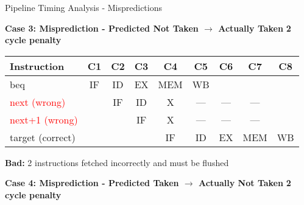 \documentclass[aspectratio=169,12pt]{beamer}
\newcommand{\xmark}{\ding{55}} %
\begin{document}
\begin{frame}{Pipeline Timing Analysis - Mispredictions}
\scriptsize
\vspace{0.3cm}

\begin{center}
\colorbox{red!10}{
\begin{minipage}{0.95\textwidth}
\textbf{Case 3: Misprediction - Predicted Not Taken $\rightarrow$ Actually Taken} \hfill \textcolor{red!70!black}{\textbf{2 cycle penalty} \xmark}
\vspace{0.1cm}

\begin{tabular}{l|c|c|c|c|c|c|c|c}
\textbf{Instruction} & \textbf{C1} & \textbf{C2} & \textbf{C3} & \textbf{C4} & \textbf{C5} & \textbf{C6} & \textbf{C7} & \textbf{C8} \\
\hline
beq & \cellcolor{normalexec!40}IF & \cellcolor{normalexec!40}ID & \cellcolor{normalexec!40}EX & \cellcolor{normalexec!40}MEM & \cellcolor{normalexec!40}WB & & & \\
\textcolor{red}{next (wrong)} & & \cellcolor{normalexec!40}IF & \cellcolor{flushcolor!40}ID & \cellcolor{flushcolor!40}\textsf{X} & \cellcolor{emptycolor}--- & \cellcolor{emptycolor}--- & \cellcolor{emptycolor}--- & \\
\textcolor{red}{next+1 (wrong)} & & & \cellcolor{flushcolor!40}IF & \cellcolor{flushcolor!40}\textsf{X} & \cellcolor{emptycolor}--- & \cellcolor{emptycolor}--- & \cellcolor{emptycolor}--- & \\
target (correct) & & & & \cellcolor{normalexec!40}IF & \cellcolor{normalexec!40}ID & \cellcolor{normalexec!40}EX & \cellcolor{normalexec!40}MEM & \cellcolor{normalexec!40}WB \\
\end{tabular}

\vspace{0.05cm}
\footnotesize \textbf{Bad:} 2 instructions fetched incorrectly and must be flushed
\end{minipage}
}
\end{center}

\vspace{0.4cm}

\begin{center}
\colorbox{red!10}{
\begin{minipage}{0.95\textwidth}
\textbf{Case 4: Misprediction - Predicted Taken $\rightarrow$ Actually Not Taken} \hfill \textcolor{red!70!black}{\textbf{2 cycle penalty} \xmark}
\vspace{0.1cm}


\end{minipage}}
\end{center}
\end{frame}
\end{document}
